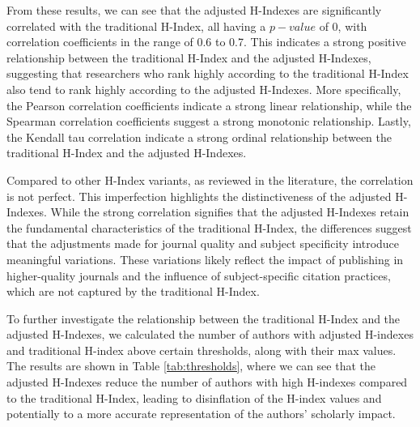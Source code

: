 From these results, we can see that the adjusted H-Indexes are significantly
correlated with the traditional H-Index, all having a $p-value$ of $0$, with
correlation coefficients in the range of 0.6 to 0.7. This indicates a strong
positive relationship between the traditional H-Index and the adjusted
H-Indexes, suggesting that researchers who rank highly according to the
traditional H-Index also tend to rank highly according to the adjusted
H-Indexes. More specifically, the Pearson correlation coefficients indicate a
strong linear relationship, while the Spearman correlation coefficients suggest
a strong monotonic relationship. Lastly, the Kendall tau correlation indicate a
strong ordinal relationship between the traditional H-Index and the adjusted
H-Indexes.

Compared to other H-Index variants, as reviewed in the literature, the
correlation is not perfect. This imperfection highlights the distinctiveness of
the adjusted H-Indexes. While the strong correlation signifies that the
adjusted H-Indexes retain the fundamental characteristics of the traditional
H-Index, the differences suggest that the adjustments made for journal quality
and subject specificity introduce meaningful variations. These variations
likely reflect the impact of publishing in higher-quality journals and the
influence of subject-specific citation practices, which are not captured by the
traditional H-Index.

To further investigate the relationship between the traditional H-Index and the
adjusted H-Indexes, we calculated the number of authors with adjusted H-indexes
and traditional H-index above certain thresholds, along with their max values.
The results are shown in Table \ref{tab:thresholds}, where we can see that the
adjusted H-Indexes reduce the number of authors with high H-indexes compared to
the traditional H-Index, leading to disinflation of the H-index values and
potentially to a more accurate representation of the authors' scholarly impact.

